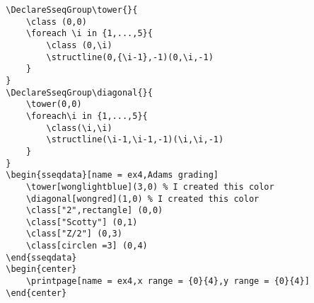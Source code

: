 \begin{tcolorbox}[title=Exercise 16,colback=black!80!white,coltext=white]
    \begin{verbatim}
        \DeclareSseqGroup\tower{}{
            \class (0,0)
            \foreach \i in {1,...,5}{
                \class (0,\i)
                \structline(0,{\i-1},-1)(0,\i,-1)
            }
        }
        \DeclareSseqGroup\diagonal{}{
            \tower(0,0)
            \foreach\i in {1,...,5}{
                \class(\i,\i)
                \structline(\i-1,\i-1,-1)(\i,\i,-1)
            }
        }
        \begin{sseqdata}[name = ex4,Adams grading]
            \tower[wonglightblue](3,0) % I created this color
            \diagonal[wongred](1,0) % I created this color
            \class["2",rectangle] (0,0)
            \class["Scotty"] (0,1)
            \class["Z/2"] (0,3)
            \class[circlen =3] (0,4)
        \end{sseqdata}
        \begin{center}
            \printpage[name = ex4,x range = {0}{4},y range = {0}{4}]
        \end{center}
    \end{verbatim}
\end{tcolorbox}